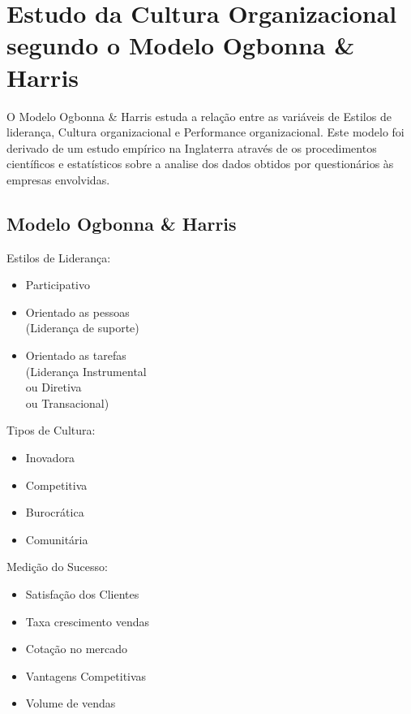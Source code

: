 \section{Estudo da Cultura Organizacional segundo o Modelo Ogbonna \& Harris}
\qquad O Modelo Ogbonna \& Harris estuda a relação entre as variáveis de Estilos de liderança, Cultura organizacional e Performance organizacional. Este modelo foi derivado de um estudo empírico na Inglaterra através de os procedimentos científicos e estatísticos sobre a analise dos dados obtidos por questionários às empresas envolvidas.
\subsection{Modelo Ogbonna \& Harris}
\emptyline
\begin{minipage}[t]{.31\linewidth}
\quad Estilos de Liderança:
\begin{itemize}
\setlength\itemsep{-0.3em}
\item Participativo
\item Orientado as pessoas\\
(Liderança de suporte)
\item Orientado as tarefas\\
(Liderança Instrumental\\ ou Diretiva\\ ou Transacional)
\end{itemize}
\end{minipage}
\begin{minipage}[t]{.31\linewidth}
\quad Tipos de Cultura:
\begin{itemize}
\setlength\itemsep{-0.3em}
\item Inovadora
\item Competitiva
\item Burocrática
\item Comunitária
\end{itemize}
\end{minipage}
\begin{minipage}[t]{.31\linewidth}
\quad Medição do Sucesso:
\begin{itemize}
\setlength\itemsep{-0.3em}
\item Satisfação dos Clientes
\item Taxa crescimento vendas
\item Cotação no mercado
\item Vantagens Competitivas
\item Volume de vendas
\end{itemize}
\end{minipage}
